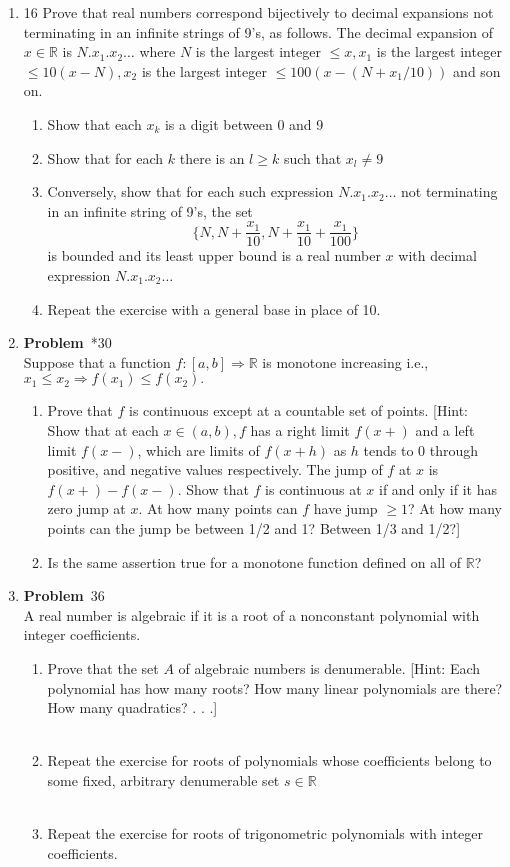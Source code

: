 \documentclass[12pt]{amsart}
\newcommand{\benu}{\begin{enumerate}}
\newcommand{\eenu}{\end{enumerate}}
\theoremstyle{definition}
\newcommand{\mbR}{\mathbb{R}}
\newcommand{\itep}{\item {\bfseries Problem}\ }
\begin{document}
\begin{enumerate}[series=p]
\newpage
\item 16
Prove that real numbers correspond bijectively  to decimal expansions not terminating in an infinite strings of 9's, as follows.  The decimal expansion of $x \in \mbR$ is $N.x_1.x_2\dots$ where $N$ is the largest integer $\leq x, x_1$ is the largest integer $\leq 10(x-N), x_2$ is the largest integer $\leq 100(x-(N+x_1/10))$ and son on.
\\
\benu
\item Show that each $x_k$ is a digit between 0 and 9
\\
\item Show that for each $k$ there is an $l \geq k$ such that $x_l \neq 9$
\\
\item Conversely, show that for each such expression $N.x_1.x_2\dots$ not terminating in an infinite string of 9's, the set
$$ \{N, N + \frac{x_1}{10}, N + \frac{x_1}{10} + \frac{x_1}{100}\}$$
is bounded and its least upper bound is a real number $x$ with decimal expression $N.x_1.x_2\dots$
\\
\item Repeat the exercise with a general base in place of 10.
\eenu

\newpage
\itep *30\\
Suppose that a function $f : [a,b] \Rightarrow \mbR$ is monotone increasing i.e., $x_1 \leq x_2 \Rightarrow f(x_1) \leq f(x_2).$
\benu
\item Prove that $f$ is continuous except at a countable set of points.  [Hint: Show that at each $x \in (a,b), f$ has a right limit $f(x+)$ and a left limit $f(x-)$, which are limits of $f(x+h)$ as $h$ tends to 0 through positive, and negative values respectively.  The jump of $f$ at $x$ is $f(x+) - f(x-)$.  Show that $f$ is continuous at $x$ if and only if it has zero jump at $x$.  At how many points can $f$ have jump $\geq 1$?  At how many points can the jump be between 1/2 and 1?  Between 1/3 and 1/2?]
\\
\item Is the same assertion true for a monotone function defined on all of $\mbR$?
\\
\eenu

\newpage
\itep 36\\
A real number is algebraic if it is a root of a nonconstant polynomial with integer coefficients.
\benu
\item Prove that the set $A$ of algebraic numbers is denumerable.  [Hint: Each polynomial has how many roots?  How many linear polynomials are there?  How many quadratics? . . .]
\\
\\
\item Repeat the exercise for roots of polynomials whose coefficients belong to some fixed, arbitrary denumerable set $s \in \mbR$
\\
\\
\item Repeat the exercise for roots of trigonometric polynomials with integer coefficients.
\\
\\
\eenu

\end{enumerate}
\end{document}
